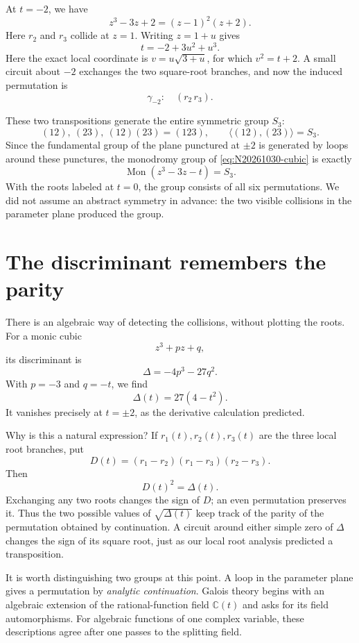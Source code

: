 At \(t=-2\), we have
\[
 z^3-3z+2=(z-1)^2(z+2).
\]
Here \(r_2\) and \(r_3\) collide at \(z=1\). Writing \(z=1+u\) gives
\begin{equation}
 t=-2+3u^2+u^3.
 \label{eq:N20261030-localminus}
\end{equation}
Here the exact local coordinate is \(v=u\sqrt{3+u}\), for which \(v^2=t+2\). A small circuit about \(-2\) exchanges the two square-root branches, and now the induced permutation is
\[
 \gamma_{-2}:\quad(r_2\,r_3).
\]

These two transpositions generate the entire symmetric group \(S_3\):
\[
 (12),\ (23),\ (12)(23)=(123),
 \qquad
 \langle(12),(23)\rangle=S_3.
\]
Since the fundamental group of the plane punctured at \(\pm2\) is generated by loops around these punctures, the monodromy group of \eqref{eq:N20261030-cubic} is exactly
\begin{equation}
 \boxed{\operatorname{Mon}(z^3-3z-t)=S_3.}
 \label{eq:N20261030-monS3}
\end{equation}
With the roots labeled at \(t=0\), the group consists of all six permutations. We did not assume an abstract symmetry in advance: the two visible collisions in the parameter plane produced the group.

\section{The discriminant remembers the parity}

There is an algebraic way of detecting the collisions, without plotting the roots. For a monic cubic
\[
 z^3+pz+q,
\]
its discriminant is
\[
 \Delta=-4p^3-27q^2.
\]
With \(p=-3\) and \(q=-t\), we find
\begin{equation}
 \Delta(t)=27(4-t^2).
 \label{eq:N20261030-discriminant}
\end{equation}
It vanishes precisely at \(t=\pm2\), as the derivative calculation predicted.

Why is this a natural expression? If \(r_1(t),r_2(t),r_3(t)\) are the three local root branches, put
\[
 D(t)=
 (r_1-r_2)(r_1-r_3)(r_2-r_3).
\]
Then
\[
 D(t)^2=\Delta(t).
\]
Exchanging any two roots changes the sign of \(D\); an even permutation preserves it. Thus the two possible values of \(\sqrt{\Delta(t)}\) keep track of the parity of the permutation obtained by continuation. A circuit around either simple zero of \(\Delta\) changes the sign of its square root, just as our local root analysis predicted a transposition.

It is worth distinguishing two groups at this point. A loop in the parameter plane gives a permutation by \emph{analytic continuation}. Galois theory begins with an algebraic extension of the rational-function field \(\mathbb C(t)\) and asks for its field automorphisms. For algebraic functions of one complex variable, these descriptions agree after one passes to the splitting field.

